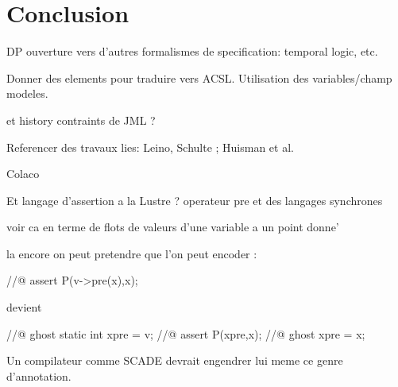 
\chapter{Conclusion}

\begin{remark}{DP}
ouverture vers d'autres formalismes de specification: temporal logic, etc.

Donner des elements pour traduire vers ACSL. Utilisation des
variables/champ modeles. 

et history contraints de JML ?

Referencer des travaux lies: Leino, Schulte ; Huisman et al.
\end{remark}

\begin{remark}{Colaco}


  Et langage d'assertion a la Lustre ? operateur pre et des langages
  synchrones

  voir ca en terme de flots de valeurs d'une variable a un point
  donne'

  la encore on peut pretendre que l'on peut encoder :


//@ assert P(v->pre(x),x);

devient

//@ ghost static int xpre = v;
//@ assert P(xpre,x);
//@ ghost xpre = x;


Un compilateur comme SCADE devrait engendrer lui meme ce genre d'annotation.


\end{remark}


